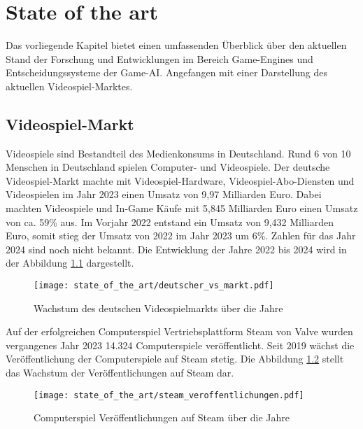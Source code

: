 \chapter{State of the art}
\label{chap:sota}

Das vorliegende Kapitel bietet einen umfassenden Überblick über den aktuellen Stand der Forschung und Entwicklungen im Bereich Game-Engines und Entscheidungssysteme der Game-AI. Angefangen mit einer Darstellung des aktuellen Videospiel-Marktes.

\section{Videospiel-Markt}
\label{chap: sota videospielmarkt}

Videospiele sind Bestandteil des Medienkonsums in Deutschland. Rund 6 von 10 Menschen in Deutschland spielen Computer- und Videospiele. Der deutsche Videospiel-Markt machte mit Videospiel-Hardware, Videospiel-Abo-Diensten und Videospielen im Jahr 2023 einen Umsatz von 9,97 Milliarden Euro. Dabei machten Videospiele und In-Game K\"{a}ufe mit 5,845 Milliarden Euro einen Umsatz von ca. 59\% aus. Im Vorjahr 2022 entstand ein Umsatz von 9,432 Milliarden Euro, somit stieg der Umsatz von 2022 im Jahr 2023 um 6\%.  Zahlen f\"{u}r das Jahr 2024 sind noch nicht bekannt. Die Entwicklung der Jahre 2022 bis 2024 wird in der Abbildung \ref{fig:dmarkt} dargestellt. 

\begin{figure}[h]
  \centering
  \texttt{[image: state\_of\_the\_art/deutscher\_vs\_markt.pdf]}
	\captionsetup{justification=justified, format=plain}
  \caption{Wachstum des deutschen Videospielmarkts \"{u}ber die Jahre}
  \label{fig:dmarkt}
\end{figure}

Auf der erfolgreichen Computerspiel Vertriebsplattform Steam von Valve wurden vergangenes Jahr 2023 14.324 Computerspiele ver\"{o}ffentlicht. Seit 2019 w\"{a}chst die Ver\"{o}ffentlichung der Computerspiele auf Steam stetig. Die Abbildung \ref{fig:steamdb} stellt das Wachstum der Veröffentlichungen auf Steam dar. 

\begin{figure}[h]
  \centering
  \texttt{[image: state\_of\_the\_art/steam\_veroffentlichungen.pdf]}
	\captionsetup{justification=justified, format=plain}
  \caption{Computerspiel Ver\"{o}ffentlichungen auf Steam \"{u}ber die Jahre}
  \label{fig:steamdb}
\end{figure}


